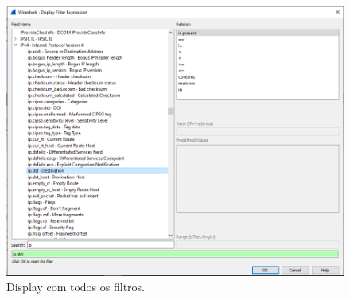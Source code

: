 \documentclass{llncs}
\begin{document}
\begin{enumerate}[\textbf{a)}]
\begin{flushleft}
      \begin{figure}[h]
        \includegraphics[scale=0.3]{menuwire02.png}
        \centering
        \caption{Display com todos os filtros.}
        \label{fig:menuwire02}
      \end{figure}  
    \end{flushleft}

  \end{enumerate}
\end{document}

